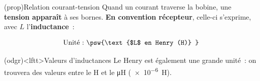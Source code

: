 \documentclass[../../main/main.tex]{subfiles}
\begin{document}
\begin{tcb*}[label=prop:Lcarac, sidebyside, righthand ratio=.3](prop){Relation
			courant-tension}
	Quand un courant traverse la bobine, une \textbf{tension apparaît} à ses
	bornes. \textbf{En convention récepteur}, celle-ci s'exprime, avec $L$
	l'\textbf{inductance}~:
	\smallbreak
	\begin{isd}[sidebyside align=top]
		\psw{%
			\[\boxed{u_L = L\dv{i}{t}}\]
		}%
		\vspace{-15pt}
		\tcblower
		\vspace{-10pt}
		\[
			\text{Unité~:~}
			\psw{%
				\text{$L$ en Henry (H)}
			}%
		\]
	\end{isd}
	\tcblower
	\vspace{-10pt}
	\begin{center}
		\vspace{-10pt}
	\end{center}
\end{tcb*}

\begin{tcb}(odgr)<lftt>{Valeurs d'inductances}
	Le Henry est également une grande unité~: on trouvera des valeurs
	entre le \si{H} et le \si{\micro H} (\SI{e-6}{H}).
\end{tcb}
\end{document}
